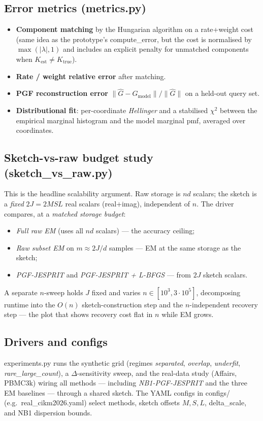 \documentclass[11pt]{article}
\newcommand{\code}[1]{\texttt{\small #1}}
\def\code#1{#1}%
\def\small{}%
\theoremstyle{definition}
\begin{document}
\subsection{Error metrics (\code{metrics.py})}
\begin{itemize}[leftmargin=2em, itemsep=1pt]
  \item \textbf{Component matching} by the Hungarian algorithm on a rate+weight cost (same idea
        as the prototype's \code{compute\_error}, but the cost is normalised by
        $\max(|\lambda|,1)$ and includes an explicit penalty for unmatched components when
        $K_{\mathrm{est}}\ne K_{\mathrm{true}}$).
  \item \textbf{Rate / weight relative error} after matching.
  \item \textbf{PGF reconstruction error} $\|\widehat G - G_{\mathrm{model}}\|/\|\widehat G\|$ on a
        held-out query set.
  \item \textbf{Distributional fit}: per-coordinate \emph{Hellinger} and a stabilised
        \emph{$\chi^2$} between the empirical marginal histogram and the model marginal pmf,
        averaged over coordinates.
\end{itemize}

\subsection{Sketch-vs-raw budget study (\code{sketch\_vs\_raw.py})}
This is the headline scalability argument. Raw storage is $nd$ scalars; the sketch is a
\emph{fixed} $2J=2MSL$ real scalars (real+imag), independent of $n$. The driver compares, at a
\emph{matched storage budget}:
\begin{itemize}[leftmargin=2em, itemsep=1pt]
  \item \emph{Full raw EM} (uses all $nd$ scalars) --- the accuracy ceiling;
  \item \emph{Raw subset EM} on $m\approx 2J/d$ samples --- EM at the same storage as the sketch;
  \item \emph{PGF-JESPRIT} and \emph{PGF-JESPRIT + L-BFGS} --- from $2J$ sketch scalars.
\end{itemize}
A separate $n$-sweep holds $J$ fixed and varies $n\in[10^3,3\!\cdot\!10^5]$, decomposing runtime
into the $O(n)$ sketch-construction step and the $n$-independent recovery step --- the
plot that shows recovery cost flat in $n$ while EM grows.

\subsection{Drivers and configs}
\code{experiments.py} runs the synthetic grid (regimes \emph{separated}, \emph{overlap},
\emph{underfit}, \emph{rare\_large\_count}), a $\Delta$-sensitivity sweep, and the real-data
study (Affairs, PBMC3k) wiring all methods --- including \emph{NB1-PGF-JESPRIT} and the three EM
baselines --- through a shared sketch. The YAML configs in \code{configs/} (e.g.\
\code{real\_cikm2026.yaml}) select methods, sketch offsets $M,S,L$, \code{delta\_scale}, and NB1
dispersion bounds.
\end{document}
